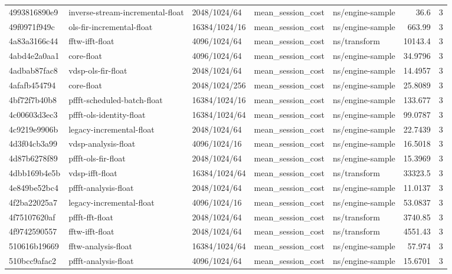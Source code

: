 \begin{longtable}{lllllrr}
4993816890e9 & inverse-stream-incremental-float & 2048/1024/64 & mean\_session\_cost & ns/engine-sample & 36.6 & 3 \\
49f0971f949c & ols-fir-incremental-float & 16384/1024/16 & mean\_session\_cost & ns/engine-sample & 663.99 & 3 \\
4a83a3166c44 & fftw-ifft-float & 4096/1024/64 & mean\_session\_cost & ns/transform & 10143.4 & 3 \\
4abd4e2a0aa1 & core-float & 4096/1024/64 & mean\_session\_cost & ns/engine-sample & 34.9796 & 3 \\
4adbab87fac8 & vdsp-ols-fir-float & 2048/1024/64 & mean\_session\_cost & ns/engine-sample & 14.4957 & 3 \\
4afafb454794 & core-float & 2048/1024/256 & mean\_session\_cost & ns/engine-sample & 25.8089 & 3 \\
4bf72f7b40b8 & pffft-scheduled-batch-float & 16384/1024/16 & mean\_session\_cost & ns/engine-sample & 133.677 & 3 \\
4c00603d3ec3 & pffft-ols-identity-float & 16384/1024/64 & mean\_session\_cost & ns/engine-sample & 99.0787 & 3 \\
4c9219e9906b & legacy-incremental-float & 2048/1024/64 & mean\_session\_cost & ns/engine-sample & 22.7439 & 3 \\
4d3f04cb3a99 & vdsp-analysis-float & 4096/1024/16 & mean\_session\_cost & ns/engine-sample & 16.5018 & 3 \\
4d87b6278f89 & pffft-ols-fir-float & 2048/1024/64 & mean\_session\_cost & ns/engine-sample & 15.3969 & 3 \\
4dbb169b4e5b & vdsp-ifft-float & 16384/1024/64 & mean\_session\_cost & ns/transform & 33323.5 & 3 \\
4e849be52bc4 & pffft-analysis-float & 2048/1024/64 & mean\_session\_cost & ns/engine-sample & 11.0137 & 3 \\
4f2ba22025a7 & legacy-incremental-float & 4096/1024/16 & mean\_session\_cost & ns/engine-sample & 53.0837 & 3 \\
4f75107620af & pffft-fft-float & 2048/1024/64 & mean\_session\_cost & ns/transform & 3740.85 & 3 \\
4f9742590557 & fftw-ifft-float & 2048/1024/64 & mean\_session\_cost & ns/transform & 4551.43 & 3 \\
510616b19669 & fftw-analysis-float & 16384/1024/64 & mean\_session\_cost & ns/engine-sample & 57.974 & 3 \\
510bcc9afac2 & pffft-analysis-float & 4096/1024/64 & mean\_session\_cost & ns/engine-sample & 15.6701 & 3 \\

\end{longtable}
